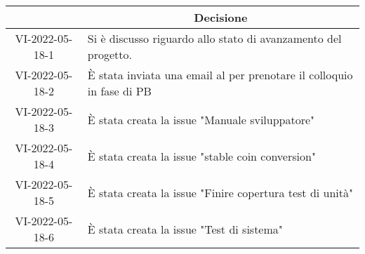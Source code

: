 \begin{table}[H]
	\centering
	\renewcommand{\arraystretch}{1.8}
	\begin{tabular}{c | p{10cm}}
		\rowcolor[HTML]{125E28}
		\multicolumn{1}{c}{\color[HTML]{FFFFFF} \textbf{ID}} &
		\multicolumn{1}{c}{\color[HTML]{FFFFFF} \textbf{Decisione}} \\
		\hline
		VI-2022-05-18-1 & Si è discusso riguardo allo stato di avanzamento del progetto. \\ \hline
		VI-2022-05-18-2 & È stata inviata una email al \commitNameS{} per prenotare il colloquio in fase di PB \\ \hline
		VI-2022-05-18-3 & È stata creata la issue "Manuale sviluppatore" \\ \hline
		VI-2022-05-18-4 & È stata creata la issue "stable coin conversion" \\ \hline
		VI-2022-05-18-5 & È stata creata la issue "Finire copertura test di unità" \\ \hline
		VI-2022-05-18-6 & È stata creata la issue "Test di sistema" \\ \hline
	\end{tabular}
\end{table}